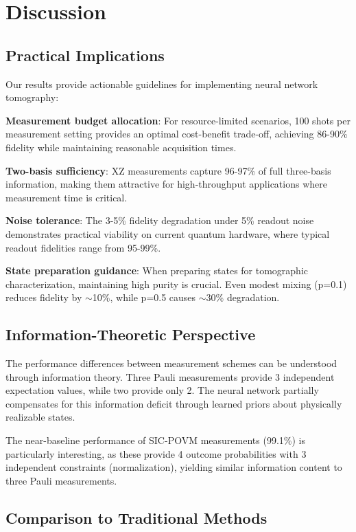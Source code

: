 \documentclass[conference]{IEEEtran}
\begin{document}
\section{Discussion}

\subsection{Practical Implications}

Our results provide actionable guidelines for implementing neural network tomography:

\textbf{Measurement budget allocation}: For resource-limited scenarios, 100 shots per measurement setting provides an optimal cost-benefit trade-off, achieving 86-90\% fidelity while maintaining reasonable acquisition times.

\textbf{Two-basis sufficiency}: XZ measurements capture 96-97\% of full three-basis information, making them attractive for high-throughput applications where measurement time is critical.

\textbf{Noise tolerance}: The 3-5\% fidelity degradation under 5\% readout noise demonstrates practical viability on current quantum hardware, where typical readout fidelities range from 95-99\%.

\textbf{State preparation guidance}: When preparing states for tomographic characterization, maintaining high purity is crucial. Even modest mixing (p=0.1) reduces fidelity by $\sim$10\%, while p=0.5 causes $\sim$30\% degradation.

\subsection{Information-Theoretic Perspective}

The performance differences between measurement schemes can be understood through information theory. Three Pauli measurements provide 3 independent expectation values, while two provide only 2. The neural network partially compensates for this information deficit through learned priors about physically realizable states.

The near-baseline performance of SIC-POVM measurements (99.1\%) is particularly interesting, as these provide 4 outcome probabilities with 3 independent constraints (normalization), yielding similar information content to three Pauli measurements.

\subsection{Comparison to Traditional Methods}
\end{document}

